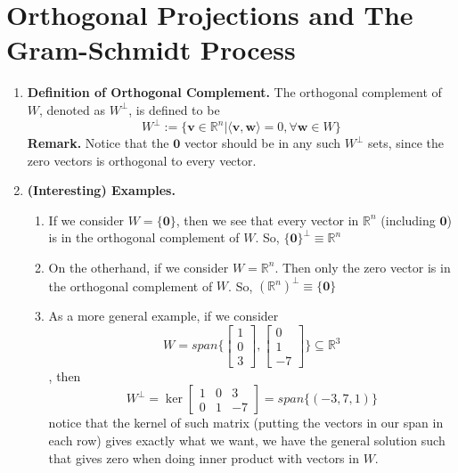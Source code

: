 \documentclass[oneside, 12pt]{book}
\newcommand{\settag}[1]{\renewcommand{\theenumi}{#1}}
\newcommand{\R}{\mathbb{R}}
\newcommand{\real}{\mathbb{R}}
\newcommand{\tbf}[1]{\textbf{#1}}
\newcommand{\para}[1]{\item \tbf{#1}}
\newcommand{\vv}{\mathbf{v}}
\newcommand{\vw}{\mathbf{w}}
\newcommand{\vzero}{\mathbf{0}}
\begin{document}
\section{Orthogonal Projections and The Gram-Schmidt Process}
\begin{enumerate}
    \settag{4.4.1}
    \para{Definition of Orthogonal Complement.} The orthogonal complement of $W$, denoted as 
    $W^{\perp}$, is defined to be
    \begin{equation*}
        W^\perp := \{\vv\in \R^n | \langle \vv,\vw\rangle = 0, \forall \vw \in W\}
    \end{equation*}
    \textbf{Remark.} Notice that the $\vzero$ vector should be in any such $W^\perp$ sets, 
    since the zero vectors is orthogonal to every vector.
    
    \settag{4.4.2}
    \para{(Interesting) Examples.}
    \begin{enumerate}
        \item If we consider $W = \{\vzero\}$, then we see that every vector in $\R^n$ (including $\vzero$)
        is in the orthogonal complement of $W$. So, $\{\vzero\}^\perp\equiv \R^n$
        \item On the otherhand, if we consider $W = \R^n$. Then only the zero vector is in the orthogonal 
        complement of $W$. So, $(\R^n)^\perp \equiv \{\vzero\}$
        \item As a more general example, if we consider 
        $$W = span\{ \begin{bmatrix}
            1 \\ 0 \\ 3
        \end{bmatrix}, \begin{bmatrix}
            0 \\ 1 \\ -7
        \end{bmatrix} \}\subseteq \real^3$$
        , then 
        \begin{equation*}
            W^\perp = \ker
            \begin{bmatrix}
                1 & 0 & 3\\
                0 & 1 & -7    
            \end{bmatrix}
            = span\{(-3, 7, 1)\}
        \end{equation*}
        notice that the kernel of such matrix (putting the vectors in our span in each row) gives exactly what
        we want, we have the general solution such that gives zero when doing inner product with vectors in $W$. 
    \end{enumerate}


\end{enumerate}
\end{document}
